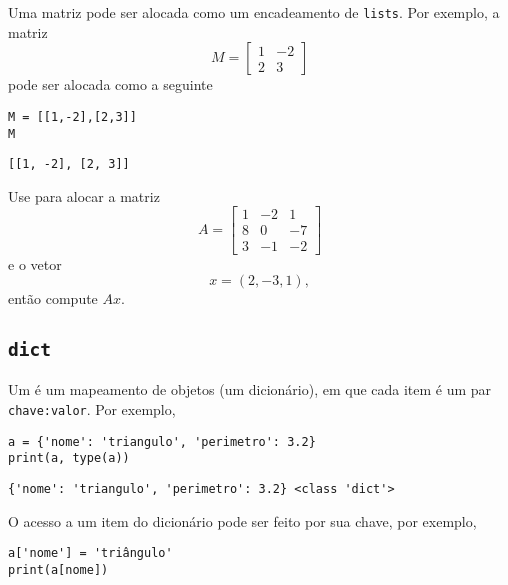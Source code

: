 \documentclass[12pt]{article}
\begin{document}
\begin{exr}
  Uma matriz pode ser alocada como um encadeamento de \texttt{lists}. Por exemplo, a matriz
  \begin{equation}
    M =
    \begin{bmatrix}
      1 & -2 \\
      2 & 3
    \end{bmatrix}
  \end{equation}
  pode ser alocada como a seguinte {\PYTHONlist}

\begin{lstlisting}
M = [[1,-2],[2,3]]
M
\end{lstlisting}

\begin{verbatim}
[[1, -2], [2, 3]]
\end{verbatim}

  Use {\PYTHONlist} para alocar a matriz
  \begin{equation}
    A =
    \begin{bmatrix}
      1 & -2 & 1\\
      8 & 0 & -7\\
      3 & -1 & -2
    \end{bmatrix}
  \end{equation}
  e o vetor
  \begin{equation}
    x = (2, -3, 1),
  \end{equation}
  então compute $Ax$.
\end{exr}

\subsection{\texttt{dict}}

Um {\PYTHONdict} é um mapeamento de objetos (um dicionário), em que cada item é um par \texttt{chave:valor}. Por exemplo,

\begin{lstlisting}
a = {'nome': 'triangulo', 'perimetro': 3.2}
print(a, type(a))
\end{lstlisting}

\begin{verbatim}
{'nome': 'triangulo', 'perimetro': 3.2} <class 'dict'>
\end{verbatim}


O acesso a um item do dicionário pode ser feito por sua chave, por exemplo,

\begin{lstlisting}
a['nome'] = 'triângulo'
print(a[nome])
\end{lstlisting}
\end{document}
